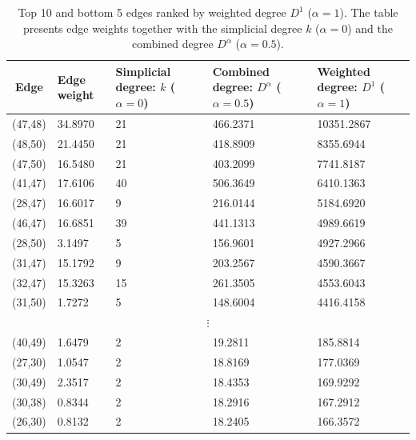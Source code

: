 \documentclass[12pt]{article}
\theoremstyle{normalhead_nobrackets}
\theoremstyle{exampstyle}
\begin{document}
\begin{table}[h!]
\centering
\setlength{\tabcolsep}{6pt}
\renewcommand{\arraystretch}{1.10}

\begin{tabular}{|c|p{1.6cm}|p{2.2cm}|p{2.3cm}|p{2.2cm}|}
\hline
\textbf{Edge} 
& \textbf{Edge weight} 
& \textbf{Simplicial degree: $k$ ($\alpha = 0$)} 
& \textbf{Combined degree: $D^\alpha$ ($\alpha = 0.5$)}
& \textbf{Weighted degree: $D^1$ ($\alpha = 1$)} \\
\hline

(47,48) & 34.8970 & 21 & 466.2371 & 10351.2867 \\
\hline
(48,50) & 21.4450 & 21 & 418.8909 & 8355.6944 \\
\hline
(47,50) & 16.5480 & 21 & 403.2099 & 7741.8187 \\
\hline
(41,47) & 17.6106 & 40 & 506.3649 & 6410.1363 \\
\hline
(28,47) & 16.6017 & 9  & 216.0144 & 5184.6920 \\
\hline
(46,47) & 16.6851 & 39 & 441.1313 & 4989.6619 \\
\hline
(28,50) & 3.1497  & 5  & 156.9601 & 4927.2966 \\
\hline
(31,47) & 15.1792 & 9  & 203.2567 & 4590.3667 \\
\hline
(32,47) & 15.3263 & 15 & 261.3505 & 4553.6043 \\
\hline
(31,50) & 1.7272  & 5  & 148.6004 & 4416.4158 \\
\hline

\multicolumn{5}{|c|}{$\vdots$} \\
\hline

(40,49) & 1.6479 & 2 & 19.2811 & 185.8814 \\
\hline
(27,30) & 1.0547 & 2 & 18.8169 & 177.0369 \\
\hline
(30,49) & 2.3517 & 2 & 18.4353 & 169.9292 \\
\hline
(30,38) & 0.8344 & 2 & 18.2916 & 167.2912 \\
\hline
(26,30) & 0.8132 & 2 & 18.2405 & 166.3572 \\
\hline

\end{tabular}
\caption{\footnotesize Top 10 and bottom 5 edges ranked by weighted degree $D^1$ ($\alpha = 1$). The table presents edge weights together with the simplicial degree $k$ ($\alpha = 0$) and the combined degree $D^\alpha$ ($\alpha = 0.5$).}
\end{table}
\end{document}
